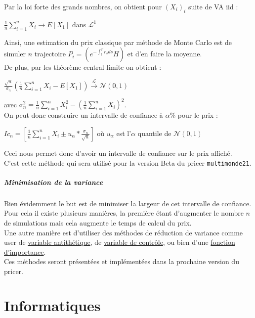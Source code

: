 \documentclass[a4paper,12pt]{article}
\begin{document}
Par la loi forte des grands nombres, on obtient pour $(X_i)_i$ suite de VA iid : 
\begin{center}
$\frac{1}{n}\sum\limits_{i=1}^nX_i \rightarrow E\left[X_1\right]$ dans $\mathcal{L}^1$
\end{center}
Ainsi, une estimation du prix classique par méthode de Monte Carlo est de simuler $n$ trajectoire $P_i = \left(e^{-\int_t^Tr_sds}H\right)$ et d'en faire la moyenne. \\[2mm]
De plus, par les théorème central-limite on obtient : 
\begin{center}
$\frac{\sqrt{n}}{\sigma_n}\left(\frac{1}{n}\sum_{i=1}^nX_i - E\left[X_1\right]\right) \overset{\mathcal{L}}{\rightarrow} \mathcal{N}(0,1)$ 
\end{center}
avec $\sigma_n^2=\frac{1}{n}\sum_{i=1}^nX_i^2-\left(\frac{1}{n}\sum_{i=1}^nX_i\right)^2$. \\

On peut donc construire un intervalle de confiance à $\alpha\%$ pour le prix : 
\begin{center}
$Ic_n=\left[\frac{1}{n}\sum_{i=1}^nX_i \pm u_\alpha * \frac{\sigma_n}{\sqrt{n}} \right]$ où $u_\alpha$ est l'$\alpha$ quantile de $\mathcal{N}(0,1)$
\end{center} 
Ceci nous permet donc d'avoir un intervalle de confiance sur le prix affiché. \\
C'est cette méthode qui sera utilisé pour la version Beta du pricer {\tt multimonde21}.
\subsubsection{Minimisation de la variance}
Bien évidemment le but est de minimiser la largeur de cet intervalle de confiance. Pour cela il existe plusieurs manières, la première étant d'augmenter le nombre $n$ de simulations mais cela augmente le temps de calcul du prix. \\

Une autre manière est d'utiliser des méthodes de réduction de variance comme user de \underline{variable antithétique}, de \underline{variable de contrôle}, ou bien d'une \underline{fonction d'importance}. \\

Ces méthodes seront présentées et implémentées dans la prochaine version du pricer.
\newpage
\part{Informatiques}
\end{document}
